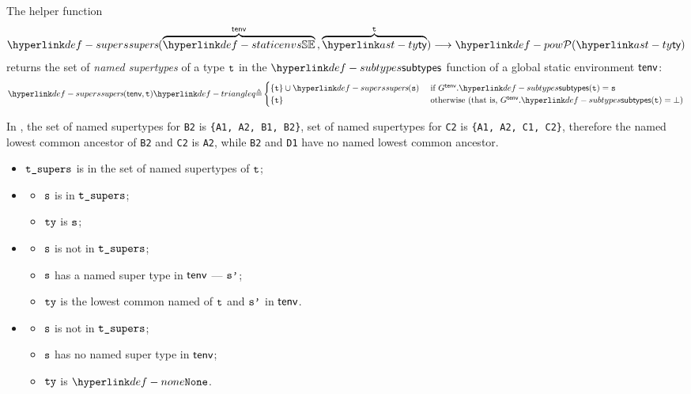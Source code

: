 \hypertarget{def-supers}{}
The helper function
\[
  \supers(\overname{\staticenvs}{\tenv} \aslsep \overname{\ty}{\vt})
  \aslto \pow{\ty}
\]
returns the set of \emph{named supertypes} of a type $\texttt{t}$
in the $\subtypes$ function of a global static environment $\textsf{tenv}$:
\[
  \supers(\tenv, \vt) \triangleq
  \begin{cases}
    \{\vt\} \cup \supers(\vs) & \text{ if }G^\tenv.\subtypes(\vt) = \vs\\
    \{\vt\}  & \text{ otherwise } (\text{that is, }G^\tenv.\subtypes(\vt) = \bot)\\
  \end{cases}
\]

In ,
the set of named supertypes for \verb|B2| is \verb|{A1, A2, B1, B2}|,
set of named supertypes for \verb|C2| is \verb|{A1, A2, C1, C2}|,
therefore the named lowest common ancestor of \verb|B2| and \verb|C2|
is \verb|A2|, while \verb|B2| and \verb|D1| have no
named lowest common ancestor.


\ProseParagraph
\OneApplies
\begin{itemize}
  \item $\texttt{t\_supers}$ is in the set of named supertypes of $\texttt{t}$;
  \item {}
  \begin{itemize}
    \item $\texttt{s}$ is in $\texttt{t\_supers}$;
    \item $\texttt{ty}$ is $\texttt{s}$;
  \end{itemize}

  \item {}
  \begin{itemize}
    \item $\texttt{s}$ is not in $\texttt{t\_supers}$;
    \item $\texttt{s}$ has a named super type in $\textsf{tenv}$ --- $\texttt{s'}$;
    \item $\texttt{ty}$ is the lowest common named \supertypeterm{} of $\texttt{t}$ and $\texttt{s'}$ in $\textsf{tenv}$.
  \end{itemize}

  \item {}
  \begin{itemize}
    \item $\texttt{s}$ is not in $\texttt{t\_supers}$;
    \item $\texttt{s}$ has no named super type in $\textsf{tenv}$;
    \item $\texttt{ty}$ is $\None$.
  \end{itemize}
\end{itemize}

